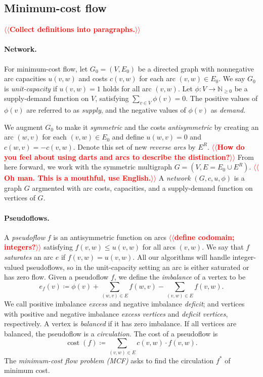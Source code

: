 \documentclass[11pt]{article}
\makeatletter
\def\ints{\mathbb{N}}
\def\fsupply{\phi}
\theoremstyle{plain}
\def\cost{\operatorname{cost}}
\def\n@te#1{\textsf{\boldmath \textbf{$\langle\!\langle$#1$\rangle\!\rangle$}}\leavevmode}
\def\note#1{\textcolor{red}{\n@te{#1}}}
\makeatother
\begin{document}
\subsection{Minimum-cost flow}

\note{Collect definitions into paragraphs.}

\paragraph{Network.}
For minimum-cost flow, let $G_0 = (V, E_0)$ be a directed graph with
nonnegative arc capacities $u(v, w)$ and costs $c(v, w)$ for each arc
$(v, w) \in E_0$.
We say $G_0$ is \emph{unit-capacity} if $u(v, w) = 1$ holds for all arc $(v, w)$.
Let $\fsupply: V \to \ints_{\geq 0}$ be a supply-demand function on $V$, satisfying $\sum_{v \in V} \fsupply(v) = 0$.
The positive values of $\fsupply(v)$ are referred to as \emph{supply}, and the negative values of $\fsupply(v)$ as \emph{demand}.

We augment $G_0$ to make it \emph{symmetric}
and the costs
\emph{antisymmetric}
by creating an arc $(w, v)$ for each $(v, w) \in E_0$ and define $u(w, v) = 0$ and $c(w, v) = -c(v, w)$.
Denote this set of new \emph{reverse arcs} by $E^R$.
\note{How do you feel about using darts and arcs to describe the distinction?}
From here forward, we work with the symmetric multigraph
$G = (V, E = E_0 \cup E^R)$. \note{Oh man.  This is a mouthful, use English.}
A \emph{network} $(G, c, u, \fsupply)$ is a graph $G$ argmented with arc costs, capacities, and a supply-demand function on vertices of $G$.

\paragraph{Pseudoflows.}
A \emph{pseudoflow} $f$ is an antisymmetric function on arcs \note{define codomain; integers?}
satisfying $f(v, w) \leq u(v, w)$ for all arcs $(v, w)$.
We say that $f$ \emph{saturates} an arc $e$ if $f(v, w) = u(v, w)$.
All our algorithms will handle integer-valued pseudoflows, so in the
unit-capacity setting an arc is either saturated or has zero flow.
Given a pseudoflow $f$, we define the \emph{imbalance} of a vertex to be
\[
e_f(v) \coloneqq \fsupply(v) + \sum_{(w, v) \in E}{f(w, v)} - \sum_{(v, w) \in E}{f(v, w)}.
\]
We call positive imbalance \emph{excess} and negative imbalance \emph{deficit}; and
vertices with positive and negative imbalance \emph{excess vertices} and \emph{deficit vertices}, respectively.
A vertex is \emph{balanced} if it has zero imbalance.
If all vertices are balanced, the pseudoflow is a \emph{circulation}.
The cost of a pseudoflow is
\[
\cost(f) \coloneqq \sum_{(v, w) \in E} c(v, w) \cdot f(v, w).
\]
The \emph{minimum-cost flow problem (MCF)} asks to find the circulation $f^*$ of
minimum cost.
\end{document}
